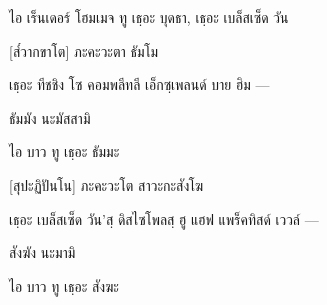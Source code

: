 \begin{english}
\vin ไอ เร็นเดอร์ โฮมเมจ ทู เธฺอะ บุดธา, เธฺอะ เบล็สเซ็ด วัน 
\end{english}

[ส๎วากขาโต] ภะคะวะตา ธัมโม

\begin{english}
เธฺอะ ทีชชิง โซ คอมพลีทลี เอ็กซฺเพลนด์ บาย ฮิม —
\end{english}

ธัมมัง นะมัสสามิ

\begin{english}
\vin ไอ บาว ทู เธฺอะ ธัมมะ 
\end{english}

[สุปะฏิปันโน] ภะคะวะโต สาวะกะสังโฆ

\begin{english}
เธฺอะ เบล็สเซ็ด วัน’สฺ ดิสไซโพลสฺ ฮู แฮฟ แพร็คทิสด์ เววล์ —
\end{english}

สังฆัง นะมามิ

\begin{english}
\vin ไอ บาว ทู เธฺอะ สังฆะ 
\end{english}
